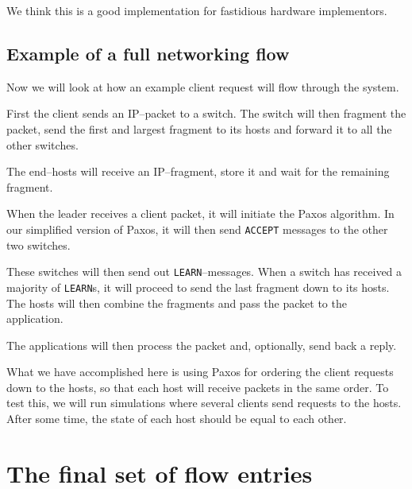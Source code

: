 We think this is a good implementation for fastidious hardware implementors.

\subsection{Example of a full networking flow}

Now we will look at how an example client request will flow through the
system.

First the client sends an IP--packet to a switch.
The switch will then fragment the packet, send the first and largest
fragment to its hosts and forward it to all the other switches.

The end--hosts will receive an IP--fragment, store it and wait for the
remaining fragment.

When the leader receives a client packet, it will initiate the Paxos
algorithm.  In our simplified version of Paxos, it will then send
\texttt{ACCEPT} messages to the other two switches.

These switches will then send out \texttt{LEARN}--messages.
When a switch has received a majority of \texttt{LEARN}s, it will proceed to
send the last fragment down to its hosts.  The hosts will then combine the
fragments and pass the packet to the application.

The applications will then process the packet and, optionally, send back a
reply.


What we have accomplished here is using Paxos for ordering the client
requests down to the hosts, so that each host will receive packets in the
same order.  To test this, we will run simulations where several clients
send requests to the hosts. After some time, the state of each host should
be equal to each other.

\section{The final set of flow entries}



